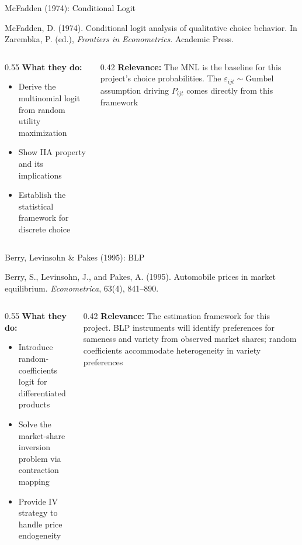 \documentclass[aspectratio=169,professionalfonts]{beamer}
\newcommand{\hl}[1]{\textbf{\textcolor{UGARed}{#1}}}
\begin{document}
\begin{frame}{McFadden (1974): Conditional Logit}
  \begin{tcolorbox}[colback=red!5!white, colframe=UGARed, title=\textbf{Citation}]
    McFadden, D. (1974). Conditional logit analysis of qualitative choice behavior.
    In Zarembka, P. (ed.), \textit{Frontiers in Econometrics}. Academic Press.
  \end{tcolorbox}
  \vspace{6pt}
  \begin{columns}[T]
    \begin{column}{0.55\textwidth}
      \hl{What they do:}
      \begin{itemize}
        \item Derive the multinomial logit from random utility maximization
        \item Show IIA property and its implications
        \item Establish the statistical framework for discrete choice
      \end{itemize}
    \end{column}
    \begin{column}{0.42\textwidth}
      \hl{Relevance:} The MNL is the baseline for this project's choice probabilities.
      The $\varepsilon_{ijt} \sim \text{Gumbel}$ assumption driving $P_{ijt}$ comes
      directly from this framework
    \end{column}
  \end{columns}
\end{frame}

\begin{frame}{Berry, Levinsohn \& Pakes (1995): BLP}
  \begin{tcolorbox}[colback=red!5!white, colframe=UGARed, title=\textbf{Citation}]
    Berry, S., Levinsohn, J., and Pakes, A. (1995). Automobile prices in market
    equilibrium. \textit{Econometrica}, 63(4), 841--890.
  \end{tcolorbox}
  \vspace{6pt}
  \begin{columns}[T]
    \begin{column}{0.55\textwidth}
      \hl{What they do:}
      \begin{itemize}
        \item Introduce random-coefficients logit for differentiated products
        \item Solve the market-share inversion problem via contraction mapping
        \item Provide IV strategy to handle price endogeneity
      \end{itemize}
    \end{column}
    \begin{column}{0.42\textwidth}
      \hl{Relevance:} The estimation framework for this project. BLP instruments will
      identify preferences for sameness and variety from observed market shares; random coefficients
      accommodate heterogeneity in variety preferences
    \end{column}
  \end{columns}
\end{frame}
\end{document}
